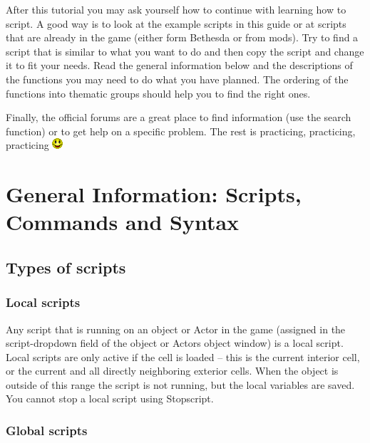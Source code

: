 \documentclass[
]{article}
\begin{document}
After this tutorial you may ask yourself how to continue with learning
how to script. A good way is to look at the example scripts in this
guide or at scripts that are already in the game (either form Bethesda
or from mods). Try to find a script that is similar to what you want to
do and then copy the script and change it to fit your needs. Read the
general information below and the descriptions of the functions you may
need to do what you have planned. The ordering of the functions into
thematic groups should help you to find the right ones.

Finally, the official forums are a great place to find information (use
the search function) or to get help on a specific problem. The rest is
practicing, practicing, practicing \includegraphics{media/image5.png}

\hypertarget{general-information-scripts-commands-and-syntax}{%
\section{\texorpdfstring{\hfill\break
General Information: Scripts, Commands and
Syntax}{ General Information: Scripts, Commands and Syntax}}\label{general-information-scripts-commands-and-syntax}}

\hypertarget{types-of-scripts}{%
\subsection{Types of scripts}\label{types-of-scripts}}

\hypertarget{local-scripts}{%
\subsubsection{Local scripts}\label{local-scripts}}

Any script that is running on an object or Actor in the game (assigned
in the script-dropdown field of the object or Actors object window) is a
local script. Local scripts are only active if the cell is loaded --
this is the current interior cell, or the current and all directly
neighboring exterior cells. When the object is outside of this range the
script is not running, but the local variables are saved. You cannot
stop a local script using Stopscript.

\hypertarget{global-scripts}{%
\subsubsection{Global scripts}\label{global-scripts}}
\end{document}
